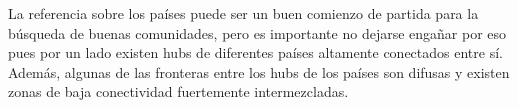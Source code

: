 La referencia sobre los países puede ser un buen comienzo de partida para la búsqueda de buenas comunidades, pero es importante no dejarse engañar por eso pues por un lado existen hubs de diferentes países altamente conectados entre sí. Además, algunas de las fronteras entre los hubs de los países son difusas y existen zonas de baja conectividad fuertemente intermezcladas.